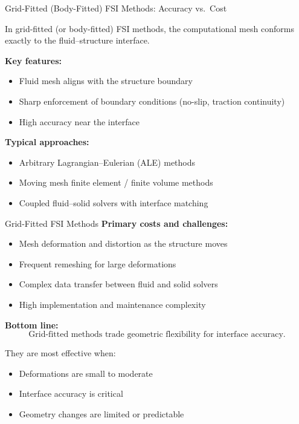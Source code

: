 \documentclass{beamer}
\begin{document}
\begin{frame}{Grid-Fitted (Body-Fitted) FSI Methods: Accuracy vs.\ Cost}
\small

In grid-fitted (or body-fitted) FSI methods, the computational mesh
conforms exactly to the fluid--structure interface.

\medskip
\textbf{Key features:}
\begin{itemize}
    \item Fluid mesh aligns with the structure boundary
    \item Sharp enforcement of boundary conditions (no-slip, traction continuity)
    \item High accuracy near the interface
\end{itemize}

\medskip
\textbf{Typical approaches:}
\begin{itemize}
    \item Arbitrary Lagrangian--Eulerian (ALE) methods
    \item Moving mesh finite element / finite volume methods
    \item Coupled fluid--solid solvers with interface matching
\end{itemize}
\end{frame}

\begin{frame}{Grid-Fitted FSI Methods}
\textbf{Primary costs and challenges:}
\begin{itemize}
    \item Mesh deformation and distortion as the structure moves
    \item Frequent remeshing for large deformations
    \item Complex data transfer between fluid and solid solvers
    \item High implementation and maintenance complexity
\end{itemize}

\medskip
\textbf{Bottom line:}
\[
\text{Grid-fitted methods trade geometric flexibility for interface accuracy.}
\]

They are most effective when:
\begin{itemize}
    \item Deformations are small to moderate
    \item Interface accuracy is critical
    \item Geometry changes are limited or predictable
\end{itemize}

\end{frame}
\end{document}
